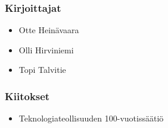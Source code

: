 \subsubsection*{Kirjoittajat}
\begin{itemize}
\item Otte Heinävaara
\item Olli Hirviniemi
\item Topi Talvitie
\end{itemize}

\subsubsection*{Kiitokset}
\begin{itemize}
\item Teknologiateollisuuden 100-vuotissäätiö
\end{itemize}

